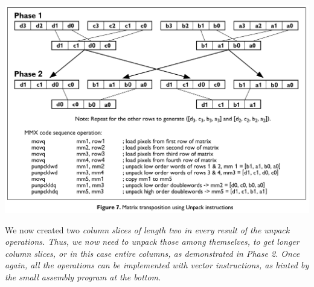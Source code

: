 \documentclass[../../main.tex]{subfiles}
\begin{document}
\begin{description}
    \includegraphics[width=\textwidth]{chapters/07/transpose.png}

    We now created two \em column slices \em of length two in every result of the unpack operations. Thus, we now need to unpack those among themselves, to get longer column slices, or in this case entire columns, as demonstrated in \em Phase 2\em .
    Once again, all the operations can be implemented with vector instructions, as hinted by the small assembly program at the bottom.
\end{description}
\end{document}
